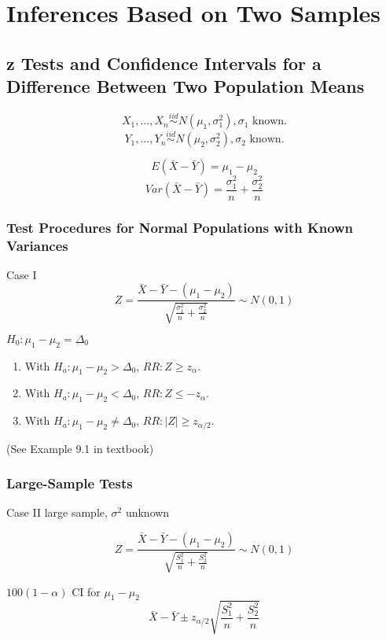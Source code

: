 \chapter{Inferences Based on Two Samples}
\section{z Tests and Confidence Intervals for a Difference Between Two Population Means}

\[X_1,\dots,X_n \overset{iid}{\sim} N(\mu_1,\sigma_1^2), \sigma_1 \text{ known}.\]
\[Y_1,\dots,Y_n \overset{iid}{\sim} N(\mu_2,\sigma_2^2), \sigma_2 \text{ known}.\]

\begin{prop}
\[E(\bar{X}-\bar{Y})=\mu_1-\mu_2\]
\[Var(\bar{X}-\bar{Y})=\frac{\sigma_1^2}{n}+\frac{\sigma_2^2}{n}\]
\end{prop}

\subsection{Test Procedures for Normal Populations with Known Variances}
Case I
\[Z=\frac{\bar{X}-\bar{Y}-(\mu_1-\mu_2)}{\sqrt{\frac{\sigma_1^2}{n}+\frac{\sigma_2^2}{n}}} \sim N(0,1)\]

$H_0:\mu_1-\mu_2=\Delta_0$
\begin{enumerate}
\item With $H_a: \mu_1-\mu_2>\Delta_0$, $RR:Z\geq z_{\alpha}$.
\item With $H_a: \mu_1-\mu_2<\Delta_0$, $RR:Z\leq -z_{\alpha}$.
\item With $H_a: \mu_1-\mu_2\neq\Delta_0$, $RR:|Z|\geq z_{\alpha/2}$.
\end{enumerate}

\begin{exmp}
(See Example 9.1 in textbook)
\end{exmp}

\subsection{Large-Sample Tests}
Case II large sample, $\sigma^2$ unknown

\[Z=\frac{\bar{X}-\bar{Y}-(\mu_1-\mu_2)}{\sqrt{\frac{S_1^2}{n}+\frac{S_2^2}{n}}} \sim N(0,1)\]

$100(1-\alpha)$ CI for $\mu_1-\mu_2$
\[ \bar{X}-\bar{Y} \pm z_{\alpha/2} \sqrt{\frac{S_1^2}{n}+\frac{S_2^2}{n}} \]

